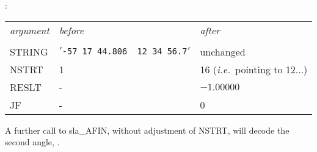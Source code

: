 \goodbreak
\setlength{\oldspacing}{\topsep}
\setlength{\topsep}{0.3ex}
\begin{description}
 \item [EXAMPLE]: \\ [1.5ex]
  \begin{tabular}{p{9em}p{15em}p{15em}}
   {\it argument} & {\it before} & {\it after} \\ \\
   STRING & $'$\verb*|-57 17 44.806  12 34 56.7|$'$ & unchanged \\
   NSTRT & 1 & 16 ({\it i.e.}\ pointing to 12...) \\
   RESLT & - & $-1.00000$ \\
   JF & - & 0
  \end{tabular}
 \item A further call to sla\_AFIN, without adjustment of NSTRT, will
       decode the second angle, .
\end{description}
\setlength{\topsep}{\oldspacing}
\notes
